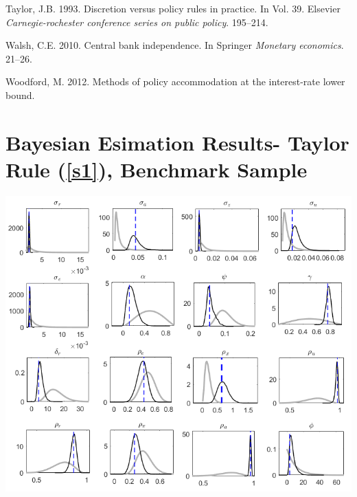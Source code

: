 \documentclass[11pt,preprint, authoryear]{elsarticle}
\let\origfigure\figure
\let\endorigfigure\endfigure
\renewenvironment{figure}[1][2] {
    \expandafter\origfigure\expandafter[H]
} {
    \endorigfigure
}
\numberwithin{equation}{section}
\numberwithin{figure}{section}
\numberwithin{table}{section}
\newlength{\cslhangindent}
\newenvironment{CSLReferences}%
  {\setlength{\parindent}{0pt}%
  \everypar{\setlength{\hangindent}{\cslhangindent}}\ignorespaces}%
  {\par}
\begin{document}
\begin{CSLReferences}{1}{0}
\leavevmode{}%
Taylor, J.B. 1993. Discretion versus policy rules in practice. In Vol.
39. Elsevier \emph{Carnegie-rochester conference series on public
policy}. 195--214.

\leavevmode{}%
Walsh, C.E. 2010. Central bank independence. In Springer \emph{Monetary
economics}. 21--26.

\leavevmode{}%
Woodford, M. 2012. Methods of policy accommodation at the interest-rate
lower bound.

\end{CSLReferences}

\newpage
\appendix
\renewcommand{\thesection}{Appendix A}

\hypertarget{bayesian-esimation-results--taylor-rule-benchmark-sample}{%
\section{\texorpdfstring{Bayesian Esimation Results- Taylor Rule
(\ref{s1}), Benchmark Sample
\label{aa}}{Bayesian Esimation Results- Taylor Rule (), Benchmark Sample }}\label{bayesian-esimation-results--taylor-rule-benchmark-sample}}

\begin{figure}[H]
\includegraphics[width=0.8\linewidth,height=0.43\textheight]{code/png_images/priors_posteriors} \caption{Estimated posterior distributions (black solid line) for the benchmark sample under the Taylor rule. The grey line shows the prior density and the black line the density of the posterior distribution. The blue horizontal line indicates the posterior mode. \label{posterior1}}\label{fig:posteriors and priors}
\end{figure}
\end{document}

